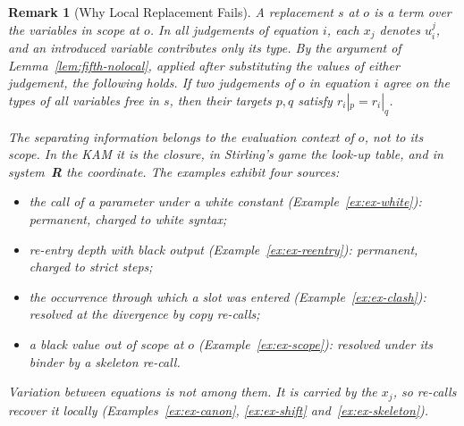 \documentclass[10pt,a4paper]{article}
\theoremstyle{plain}%
\newtheorem{remark}[theorem]{Remark}
\begin{document}
\begin{remark}[Why Local Replacement Fails]\label{rem:ex-nolocal}
A replacement $s$ at $o$ is a term over the variables in scope at $o$.
In all judgements of equation $i$, each $x_j$ denotes $u_i^j$, and an introduced variable contributes only its type.
By the argument of Lemma~\ref{lem:fifth-nolocal}, applied after substituting the values of either judgement, the following holds.
If two judgements of $o$ in equation $i$ agree on the types of all variables free in $s$, then their targets $p, q$ satisfy $r_i|_p = r_i|_q$.

The separating information belongs to the evaluation context of $o$, not to its scope.
In the KAM it is the closure, in Stirling's game the look-up table, and in system~\textbf{R} the coordinate.
The examples exhibit four sources:
\begin{itemize}
\item the call of a parameter under a white constant (Example~\ref{ex:ex-white}): permanent, charged to white syntax;
\item re-entry depth with black output (Example~\ref{ex:ex-reentry}): permanent, charged to strict steps;
\item the occurrence through which a slot was entered (Example~\ref{ex:ex-clash}): resolved at the divergence by copy re-calls;
\item a black value out of scope at $o$ (Example~\ref{ex:ex-scope}): resolved under its binder by a skeleton re-call.
\end{itemize}
Variation between equations is not among them.
It is carried by the $x_j$, so re-calls recover it locally (Examples~\ref{ex:ex-canon}, \ref{ex:ex-shift} and~\ref{ex:ex-skeleton}).
\end{remark}
\end{document}
